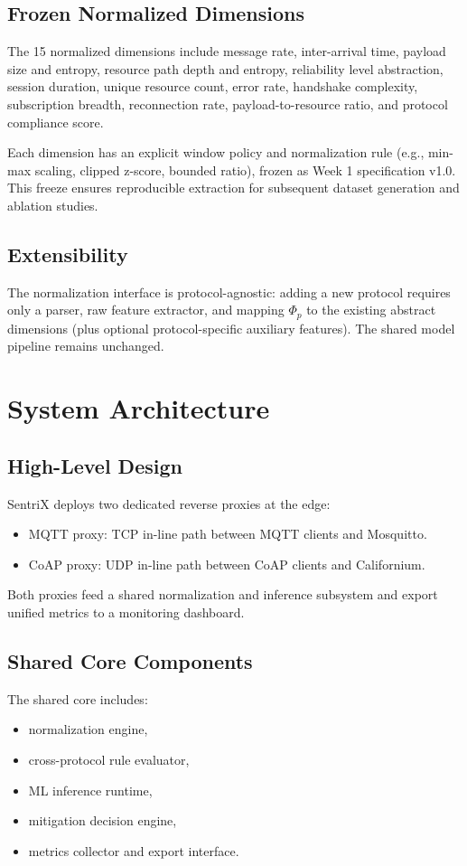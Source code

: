 \documentclass[conference]{IEEEtran}
\begin{document}
\subsection{Frozen Normalized Dimensions}
The 15 normalized dimensions include message rate, inter-arrival time, payload size and entropy, resource path depth and entropy, reliability level abstraction, session duration, unique resource count, error rate, handshake complexity, subscription breadth, reconnection rate, payload-to-resource ratio, and protocol compliance score.

Each dimension has an explicit window policy and normalization rule (e.g., min-max scaling, clipped z-score, bounded ratio), frozen as Week 1 specification v1.0. This freeze ensures reproducible extraction for subsequent dataset generation and ablation studies.

\subsection{Extensibility}
The normalization interface is protocol-agnostic: adding a new protocol requires only a parser, raw feature extractor, and mapping $\Phi_p$ to the existing abstract dimensions (plus optional protocol-specific auxiliary features). The shared model pipeline remains unchanged.

\section{System Architecture}
\subsection{High-Level Design}
SentriX deploys two dedicated reverse proxies at the edge:
\begin{itemize}
\item MQTT proxy: TCP in-line path between MQTT clients and Mosquitto.
\item CoAP proxy: UDP in-line path between CoAP clients and Californium.
\end{itemize}
Both proxies feed a shared normalization and inference subsystem and export unified metrics to a monitoring dashboard.

\subsection{Shared Core Components}
The shared core includes:
\begin{itemize}
\item normalization engine,
\item cross-protocol rule evaluator,
\item ML inference runtime,
\item mitigation decision engine,
\item metrics collector and export interface.
\end{itemize}
\end{document}

